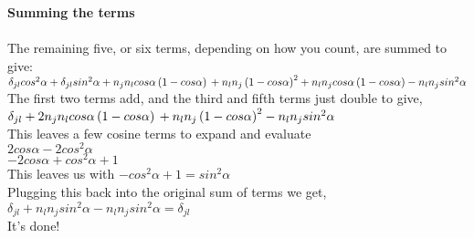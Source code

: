 \documentclass[prb,preprint]
{revtex4-1}
\begin{document}
{\bf Summing the terms}\\\\
The remaining five, or six terms, depending on how you count, are summed to give:\\
$\delta_{jl} cos^2 \alpha + \delta_{jl} sin^2 \alpha + n_j n_l cos \alpha \left(1 - cos \alpha \right)\\
+ n_l n_j \left(1 - cos \alpha \right)^2 + n_l n_j cos \alpha \left(1 - cos \alpha \right) - n_l n_j sin^2 \alpha$\\
The first two terms add, and the third and fifth terms just double to give, \\
$\delta_{jl} + 2 n_j n_l cos \alpha \left(1 - cos \alpha \right)\\
+ n_l n_j \left(1 - cos \alpha \right)^2 - n_l n_j sin^2 \alpha$\\
This leaves a few cosine terms to expand and evaluate\\
$2 cos\alpha - 2 cos^2 \alpha$\\
$-2 cos\alpha + cos^2 \alpha + 1$\\
This leaves us with $-cos^2 \alpha + 1 = sin^2 \alpha$\\
Plugging this back into the original sum of terms we get, \\
$\delta_{jl} + n_l n_j sin^2 \alpha - n_l n_j sin^2 \alpha = \delta_{jl}$\\
It's done!








\end{document}
